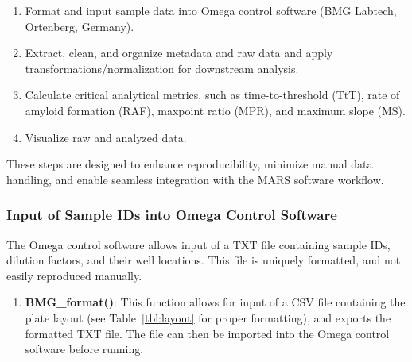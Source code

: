\documentclass[preprint,12pt,a4paper]{elsarticle}
\begin{document}
            \begin{enumerate}
                \item Format and input sample data into Omega control software (BMG Labtech, Ortenberg, Germany).
                \item Extract, clean, and organize metadata and raw data and apply transformations/normalization for downstream analysis.
                \item Calculate critical analytical metrics, such as time-to-threshold (TtT), rate of amyloid formation (RAF), maxpoint ratio (MPR), and maximum slope (MS).
                \item Visualize raw and analyzed data.
            \end{enumerate}

            These steps are designed to enhance reproducibility, minimize manual data handling, and enable seamless integration with the MARS software workflow.

            \subsubsection{Input of Sample IDs into Omega Control Software}
                The Omega control software allows input of a TXT file containing sample IDs, dilution factors, and their well locations. This file is uniquely formatted, and not easily reproduced manually.

                \begin{enumerate}
                    \item \textbf{BMG\_format()}: This function allows for input of a CSV file containing the plate layout (see Table~\ref{tbl:layout} for proper formatting), and exports the formatted TXT file. The file can then be imported into the Omega control software before running.
                \end{enumerate}
                
\end{document}
